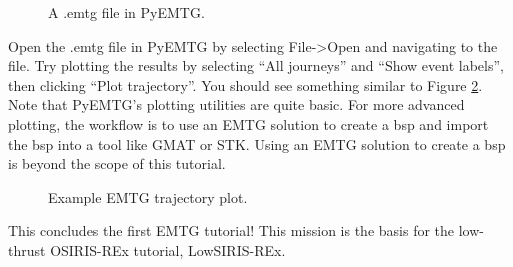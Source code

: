 \documentclass[11pt]{article}
\begin{document}
\begin{figure}[H]
	\centering
	\caption{\label{fig:PyEMTG_opening_emtg_file}A .emtg file in PyEMTG.}
\end{figure}

\noindent Open the .emtg file in PyEMTG by selecting File-\textgreater Open and navigating to the file. Try plotting the results by selecting ``All journeys'' and ``Show event labels'', then clicking ``Plot trajectory''. You should see something similar to Figure \ref{fig:traj_plot}. Note that PyEMTG’s plotting utilities are quite basic. For more advanced plotting, the workflow is to use an \ac{EMTG} solution to create a bsp and import the bsp into a tool like \ac{GMAT} or \ac{STK}. Using an \ac{EMTG} solution to create a bsp is beyond the scope of this tutorial.

\begin{figure}[H]
	\centering
	\caption{\label{fig:traj_plot}Example \ac{EMTG} trajectory plot.}
\end{figure}

\noindent This concludes the first \ac{EMTG} tutorial! This mission is the basis for the low-thrust OSIRIS-REx tutorial, LowSIRIS-REx.
\end{document}
